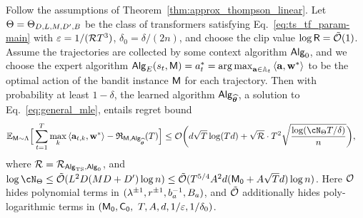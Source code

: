 \begin{theorem}
\label{thm:ts_linear_regret}
Follow the assumptions of Theorem~\ref{thm:approx_thompson_linear}. Let $\Theta = \Theta_{D, L, M, {D'}, B}$ be the class of transformers satisfying Eq.~\eqref{eq:ts_tf_param-main} with $\varepsilon=1/({\mathcal{R}}{T}^3)$,   $\delta_0=\delta/(2n)$, and choose the clip value $\log {\mathsf{R}} = {\tilde{\mathcal O}}(1)$. Assume the trajectories are collected by some context algorithm ${\mathsf{Alg}}_0$, and we choose the expert algorithm ${\mathsf{Alg}}_{E}({s}_t,{\mathsf{M}})={a}^*_t=\operatorname*{arg\,max}_{{\mathbf a}\in{\mathbb{A}}_t}\left\langle{\mathbf a},{\mathbf w}^*\right\rangle$ to be the optimal action of the bandit instance ${\mathsf{M}}$ for each trajectory. Then with probability at least $1-\delta$, the learned algorithm ${\mathsf{Alg}}_{{\widehat{{\boldsymbol \theta}}}}$, a solution to Eq.~\eqref{eq:general_mle}, entails regret bound
\begin{align*}
\E_{\inst\sim\prior}\Big[\sum_{t=1}^\totlen\max_{k}\<\ba_{t,k},\bw^*\>-\totreward_{\inst,\sAlg_\esttfpar}(\totlen)\Big]&\leq \cO \bigg( d\sqrt{T}\log(Td)+ \sqrt{\distratio} \cdot\totlen^2\sqrt{\frac{\log ( \cN_{\Parspace} \totlen/\delta ) }{n} } \bigg), 
\end{align*}
where ${\mathcal{R}} = {\mathcal{R}}_{{\mathsf{Alg}}_{\mathrm{TS}},{\mathsf{Alg}}_0}$, and $\log \cN_{\Parspace} \le \tcO(\layer^2\embd(\head\embd+\hidden)\log \Numobs )  \leq\tcO(\totlen^{5/4}\Numact^2 d(\neuron+\Numact\sqrt{\totlen}d)\log\Numobs)$. Here $\mathcal{O}$ hides polynomial terms in $({\lambda}^{\pm1}, {r}^{\pm1}, b_a^{-1}, B_a)$, and ${\tilde{\mathcal O}}$ additionally hides poly-logarithmic terms in   $({\mathsf{M_0}},{{\mathsf{C_0}}},\\~ {T}, {A}, d, 1/\varepsilon, 1/\delta_0)$. 
\end{theorem}




